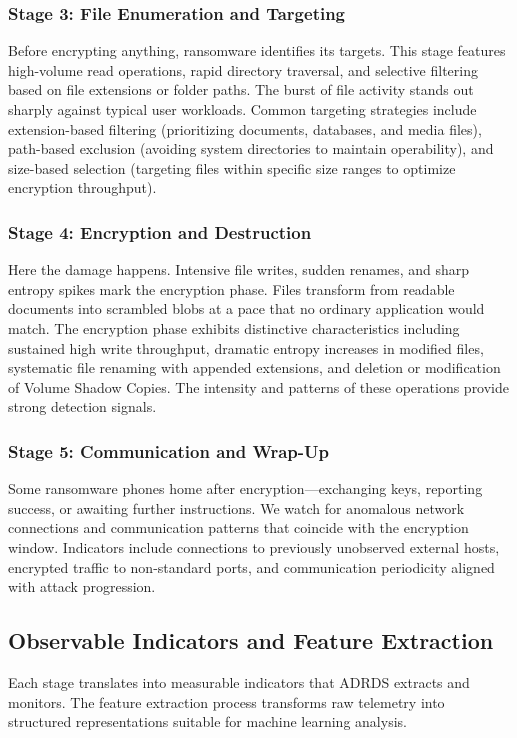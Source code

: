 \subsubsection{Stage 3: File Enumeration and Targeting}
Before encrypting anything, ransomware identifies its targets. This stage features high-volume read operations, rapid directory traversal, and selective filtering based on file extensions or folder paths. The burst of file activity stands out sharply against typical user workloads. Common targeting strategies include extension-based filtering (prioritizing documents, databases, and media files), path-based exclusion (avoiding system directories to maintain operability), and size-based selection (targeting files within specific size ranges to optimize encryption throughput).

\subsubsection{Stage 4: Encryption and Destruction}
Here the damage happens. Intensive file writes, sudden renames, and sharp entropy spikes mark the encryption phase. Files transform from readable documents into scrambled blobs at a pace that no ordinary application would match. The encryption phase exhibits distinctive characteristics including sustained high write throughput, dramatic entropy increases in modified files, systematic file renaming with appended extensions, and deletion or modification of Volume Shadow Copies. The intensity and patterns of these operations provide strong detection signals.

\subsubsection{Stage 5: Communication and Wrap-Up}
Some ransomware phones home after encryption—exchanging keys, reporting success, or awaiting further instructions. We watch for anomalous network connections and communication patterns that coincide with the encryption window. Indicators include connections to previously unobserved external hosts, encrypted traffic to non-standard ports, and communication periodicity aligned with attack progression.

\subsection{Observable Indicators and Feature Extraction}

Each stage translates into measurable indicators that ADRDS extracts and monitors. The feature extraction process transforms raw telemetry into structured representations suitable for machine learning analysis.

